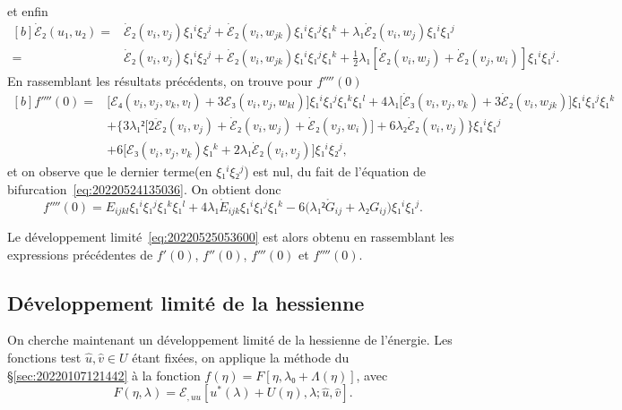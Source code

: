 \documentclass[12pt, final]{scrartcl}
\theoremstyle{definition}
\begin{document}
et enfin
\begin{equation*}
  \begin{aligned}[b]
    \dot{ℰ}₂(u₁, u₂)
    ={} & \dot{ℰ}₂ (v_i, v_j) ξ₁^i ξ₂^j + \dot{ℰ}₂(v_i, w_{j k}) ξ₁^i ξ₁^j ξ₁^k + λ₁ \dot{ℰ}₂(v_i, w_j) ξ₁^i ξ₁^j\\
    ={} & \dot{ℰ}₂(v_i, v_j) ξ₁^i ξ₂^j + \dot{ℰ}₂(v_i, w_{j k}) ξ₁^i ξ₁^j ξ₁^k + \tfrac{1}{2} λ₁ [\dot{ℰ}₂(v_i, w_j) + \dot{ℰ}₂(v_j, w_i)] ξ₁^i ξ₁^j.
  \end{aligned}
\end{equation*}
En rassemblant les résultats précédents, on trouve pour \(f''''(0)\)
\begin{equation*}
  \begin{aligned}[b]
    f''''(0)
    ={} & \bigl[ ℰ₄(v_i, v_j, v_k , v_l) + 3ℰ₃(v_i, v_j, w_{k l}) \bigr] ξ₁^i ξ₁^j ξ₁^k ξ₁^l + 4 λ₁ \bigl[\dot{ℰ}₃(v_i, v_j, v_k) + 3 \dot{ℰ}₂(v_i, w_{j k})\bigr] ξ₁^i ξ₁^j ξ₁^k\\
    & + \bigl\{3 λ₁² \bigl[ 2\ddot{ℰ}₂ (v_i, v_j) + \dot{ℰ}₂(v_i, w_j) + \dot{ℰ}₂(v_j, w_i) \bigr] + 6λ₂ \dot{ℰ}₂(v_i, v_j) \bigr\} ξ₁^i ξ₁^j\\
    & + 6\bigl[ℰ₃(v_i, v_j, v_k) ξ₁^k + 2 λ₁ \dot{ℰ}₂(v_i, v_j)\bigr] ξ₁^i ξ₂^j,
  \end{aligned}
\end{equation*}
et on observe que le dernier terme(en \(ξ₁^i ξ₂^j\)) est nul, du fait de
l'équation de bifurcation~\eqref{eq:20220524135036}. On obtient donc
\begin{equation}
  \label{eq:20220601055512}
  f''''(0) = E_{i j k l} ξ₁^i ξ₁^j ξ₁^k ξ₁^l + 4 λ₁ \mathring{E}_{i j k} ξ₁^i ξ₁^j ξ₁^k - 6 \bigl(λ₁² \mathring{G}_{i j} + λ₂ G_{i j}\bigr) ξ₁^i ξ₁^j .
\end{equation}

Le développement limité~\eqref{eq:20220525053600} est alors obtenu en
rassemblant les expressions précédentes de \(f'(0)\), \(f''(0)\), \(f'''(0)\) et
\(f''''(0)\).

\subsection{Développement limité de la hessienne}
\label{sec:20220616055207}
%

On cherche maintenant un développement limité de la hessienne de l'énergie. Les
fonctions test \(\hat{u}, \hat{v} ∈ U\) étant fixées, on applique la méthode du
\S\ref{sec:20220107121442} à la fonction \(f(η) = F [η, λ₀ + Λ(η)]\), avec
\begin{equation*}
  F(η, λ) = ℰ_{, u u} [u^{\ast}(λ) + U(η), λ; \hat{u}, \hat{v}].
\end{equation*}
\end{document}
